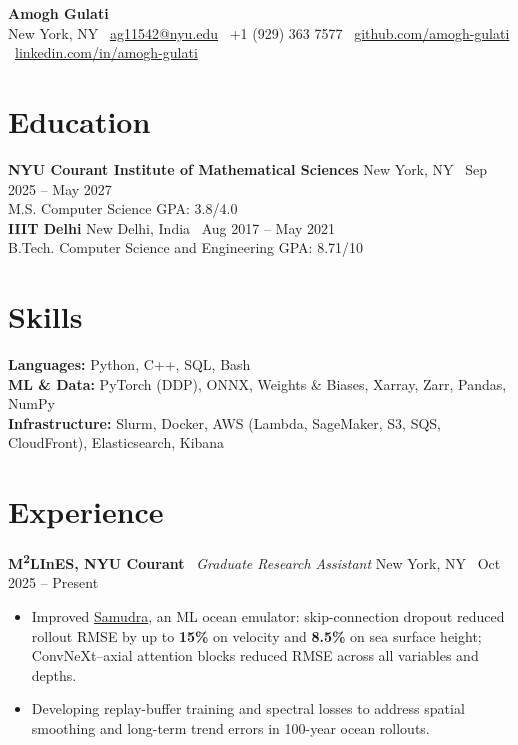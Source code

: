 \documentclass[11pt]{article}
\newcommand{\job}[4]{%
  \textbf{#1} \textbar\ \textit{#2}
  \hfill #3 \textbar\ #4\par\vspace{1pt}
}
\begin{document}
{\centering
  {\LARGE \textbf{Amogh Gulati}}\\[3pt]
  {\small
  New York, NY \textbullet\
  \href{mailto:ag11542@nyu.edu}{ag11542@nyu.edu} \textbullet\
  +1 (929) 363 7577 \textbullet\
  \href{https://github.com/amogh-gulati}{github.com/amogh-gulati} \textbullet\
  \href{https://linkedin.com/in/amogh-gulati}{linkedin.com/in/amogh-gulati}
  }\par
}

\section{Education}
\textbf{NYU Courant Institute of Mathematical Sciences}
\hfill New York, NY \textbar\ Sep 2025 -- May 2027\\
M.S. Computer Science \hfill GPA: 3.8/4.0\\[2pt]
\textbf{IIIT Delhi}
\hfill New Delhi, India \textbar\ Aug 2017 -- May 2021\\
B.Tech. Computer Science and Engineering \hfill GPA: 8.71/10

\section{Skills}
\textbf{Languages:} Python, C++, SQL, Bash\\
\textbf{ML \& Data:} PyTorch (DDP), ONNX, Weights \& Biases, Xarray, Zarr, Pandas, NumPy\\
\textbf{Infrastructure:} Slurm, Docker, AWS (Lambda, SageMaker, S3, SQS, CloudFront), Elasticsearch, Kibana

\section{Experience}
\job{M\textsuperscript{2}LInES, NYU Courant}
    {Graduate Research Assistant}
    {New York, NY}
    {Oct 2025 -- Present}
\begin{itemize}
  \item Improved \href{https://github.com/m2lines/Samudra}{Samudra}, an ML ocean emulator: skip-connection dropout reduced rollout RMSE by up to \textbf{15\%} on velocity and \textbf{8.5\%} on sea surface height; ConvNeXt--axial attention blocks reduced RMSE across all variables and depths.
  \item Developing replay-buffer training and spectral losses to address spatial smoothing and long-term trend errors in 100-year ocean rollouts.
\end{itemize}
\end{document}
